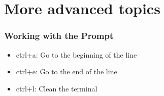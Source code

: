 
\section{More advanced topics}

\begin{frame}[fragile]
	\frametitle{Working with the Prompt}

\begin{itemize}
\item ctrl+a:	Go to the beginning of the line
\item ctrl+e:	Go to the end of the line
\item ctrl+l:   Clean the terminal
\end{itemize}

\end{frame}

